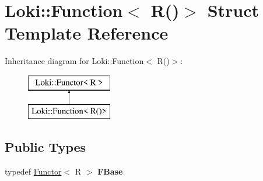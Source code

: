 \hypertarget{structLoki_1_1Function_3_01R_07_08_4}{}\section{Loki\+:\+:Function$<$ R()$>$ Struct Template Reference}
\label{structLoki_1_1Function_3_01R_07_08_4}
Inheritance diagram for Loki\+:\+:Function$<$ R()$>$\+:\begin{figure}[H]
\begin{center}
\leavevmode
\includegraphics[height=2.000000cm]{structLoki_1_1Function_3_01R_07_08_4}
\end{center}
\end{figure}
\subsection*{Public Types}
\begin{DoxyCompactItemize}
\item 
\hypertarget{structLoki_1_1Function_3_01R_07_08_4_a7b42b4dcfea51c6b19c482c969c83c99}{}typedef \hyperlink{classLoki_1_1Functor}{Functor}$<$ R $>$ {\bfseries F\+Base}\label{structLoki_1_1Function_3_01R_07_08_4_a7b42b4dcfea51c6b19c482c969c83c99}

\end{DoxyCompactItemize}

